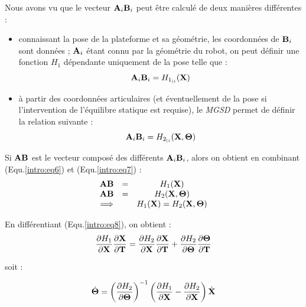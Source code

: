 Nous avons vu que le vecteur ${\bf A}_i{\bf B}_i$ peut être calculé de deux manières différentes :
\begin{itemize}
 \item connaissant la pose de la plateforme et sa géométrie, les coordonnées de ${\bf B}_i$ sont données ; ${\bf A}_i$ étant connu par la géométrie du robot, on peut définir une fonction $H_1$ dépendante uniquement de la pose telle que :
\begin{equation}
{\bf A}_i{\bf B}_i = H_{1_{|i}}({\bf X})
\label{intro:eq6}
\end{equation}
 \item à partir des coordonnées articulaires (et éventuellement de la pose si l'intervention de l'équilibre statique est requise), le {\it MGSD} permet de définir la relation suivante :
\begin{equation}
{\bf A}_i{\bf B}_i = H_{2_{|i}}({\bf X}, {\bf \Theta})
\label{intro:eq7}
\end{equation}
\end{itemize}
 
Si ${\bf AB}$ est le vecteur composé des différents ${\bf A}_i{\bf B}_i$, alors on obtient en combinant (Equ.\ref{intro:eq6}) et (Equ.\ref{intro:eq7}) :
\begin{equation}
\begin{matrix}
{\bf AB} &=& H_1({\bf X}) \\
{\bf AB} &=& H_2({\bf X}, {\bf \Theta}) \\
\Longrightarrow & & H_1({\bf X}) = H_2({\bf X}, {\bf \Theta})
\end{matrix}
\label{intro:eq8}
\end{equation}

En différentiant (Equ.\ref{intro:eq8}), on obtient :
\begin{equation}
\frac{\partial H_1}{\partial {\bf X}} \frac{\partial {\bf X}}{\partial {\bf T}} =  \frac{\partial H_2}{\partial {\bf X}} \frac{\partial {\bf X}}{\partial {\bf T}} + \frac{\partial H_2}{\partial {\bf \Theta}} \frac{\partial {\bf \Theta}}{\partial {\bf T}}
\label{intro:eq9}
\end{equation}

soit :

\begin{equation}
\dot {\bf \Theta} = \left ( \frac{\partial H_2}{\partial {\bf \Theta}} \right )^{-1} \left (\frac{\partial H_1}{\partial {\bf X}} - \frac{\partial H_2}{\partial {\bf X}} \right ) \dot {\bf X}
\label{intro:eq10}
\end{equation}

